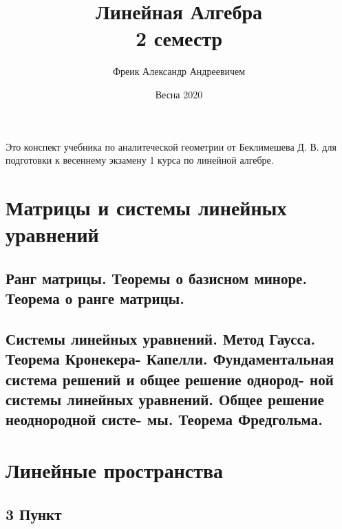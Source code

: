 \documentclass[11pt; a4paper]{report}
\theoremstyle{plain} %
\theoremstyle{defenition}
\theoremstyle{remark}
\begin{document}
 
\large
\title{Линейная Алгебра\\ 2 семестр}
\author{Фреик Александр Андреевичем} 
\date{Весна 2020}
\maketitle
Это конспект учебника по аналитеческой геометрии от Беклимешева Д. В. для подготовки к весеннему экзамену 1 курса по линейной алгебре. 
\tableofcontents

\newpage
\chapter{Матрицы и системы линейных уравнений}

\section{Ранг матрицы. Теоремы о базисном миноре. Теорема о ранге матрицы.}


\section{Системы линейных уравнений. Метод Гаусса. Теорема Кронекера- Капелли. Фундаментальная система решений и общее решение однород- ной системы линейных уравнений. Общее решение неоднородной систе- мы. Теорема Фредгольма.}


\chapter{Линейные пространства}
\section{\Large 3 Пункт}
\end{document}
